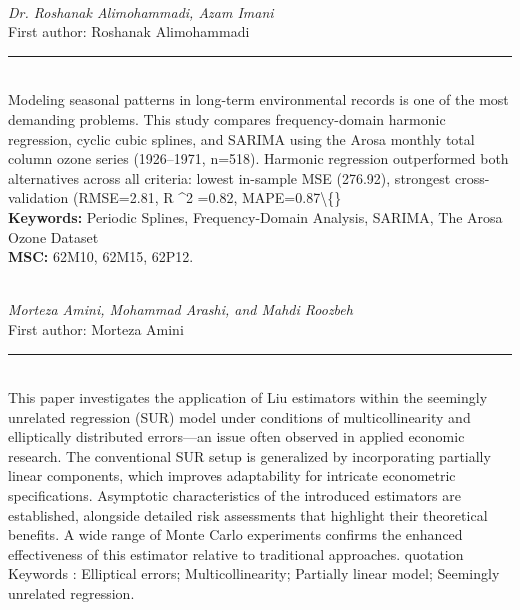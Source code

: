 \documentclass[10pt,twoside]{article}
\begin{document}
\noindent\begin{minipage}[t][\textheight]{\textwidth}
\\[0.35em]
{\itshape Dr. Roshanak Alimohammadi, Azam Imani}\\[0.2em]
{\footnotesize First author: Roshanak Alimohammadi}\\[0.45em]
\noindent\rule{\textwidth}{0.3pt}\\[0.4em]
{\footnotesize  Modeling seasonal patterns in long-term environmental records is one of the most demanding problems. This study compares frequency-domain harmonic regression, cyclic cubic splines, and SARIMA using the Arosa monthly total column ozone series (1926--1971, n=518). Harmonic regression outperformed both alternatives across all criteria: lowest in-sample MSE (276.92), strongest cross-validation (RMSE=2.81, R \textasciicircum{}2 =0.82, MAPE=0.87\textbackslash\{\}}\\[0.4em]
{\footnotesize\bfseries Keywords:} {\footnotesize Periodic Splines, Frequency-Domain Analysis, SARIMA, The Arosa Ozone Dataset}\\[0.15em]
{\footnotesize\bfseries MSC:} {\footnotesize 62M10, 62M15, 62P12.}\\
\vfill
\end{minipage}
\newpage

\noindent\begin{minipage}[t][\textheight]{\textwidth}
\\[0.35em]
{\itshape Morteza Amini, Mohammad Arashi, and Mahdi Roozbeh}\\[0.2em]
{\footnotesize First author: Morteza Amini}\\[0.45em]
\noindent\rule{\textwidth}{0.3pt}\\[0.4em]
{\footnotesize This paper investigates the application of Liu estimators within the seemingly unrelated regression (SUR) model under conditions of multicollinearity and elliptically distributed errors---an issue often observed in applied economic research. The conventional SUR setup is generalized by incorporating partially linear components, which improves adaptability for intricate econometric specifications. Asymptotic characteristics of the introduced estimators are established, alongside detailed risk assessments that highlight their theoretical benefits. A wide range of Monte Carlo experiments confirms the enhanced effectiveness of this estimator relative to traditional approaches. quotation Keywords : Elliptical errors; Multicollinearity; Partially linear model; Seemingly unrelated regression.}\\[0.4em]
\vfill
\end{minipage}
\newpage
\end{document}
